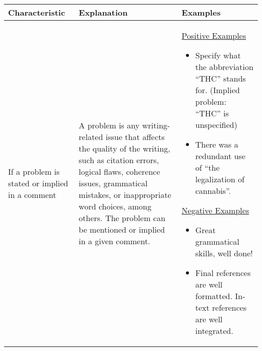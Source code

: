 \begin{table*}[]
    \centering
    \footnotesize
    \begin{tabular}{p{2.75cm}p{4cm}p{7.5cm}}
      \toprule
      \textbf{Characteristic} & \textbf{Explanation} & \textbf{Examples} \\ \midrule

      If a problem is stated or implied in a comment & A problem is any writing-related issue that affects the quality of the writing, such as citation errors, logical flaws, coherence issues, grammatical mistakes, or inappropriate word choices, among others. The problem can be mentioned or implied in a given comment. & \underline{Positive Examples}
      \begin{itemize}
          \itemsep-0.25em
          \item Specify what the abbreviation ``THC'' stands for. (Implied problem: ``THC'' is unspecified)
          \item There was a redundant use of ``the legalization of cannabis''.	
      \end{itemize} \underline{Negative Examples} \begin{itemize}
          \itemsep-0.25em
          \item Great grammatical skills, well done!
          \item Final references are well formatted. In-text references are well integrated.	
      \end{itemize} \\ \midrule


\end{tabular}
\end{table*}
